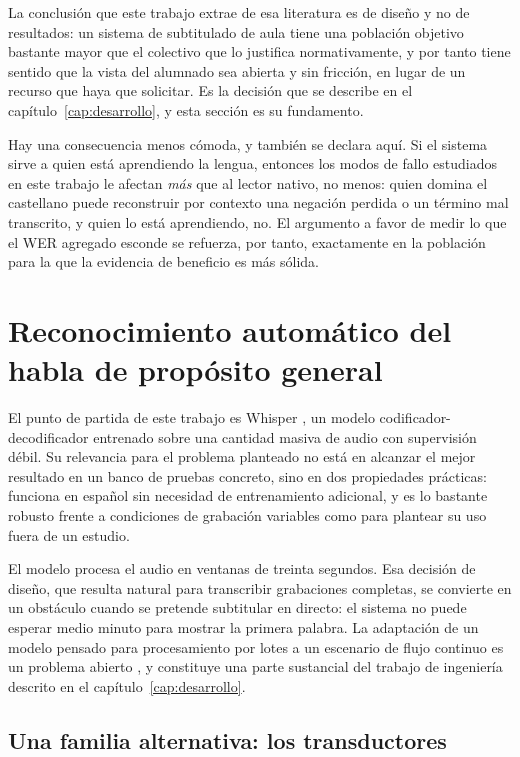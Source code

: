 La conclusión que este trabajo extrae de esa literatura es de diseño y no de resultados: un
sistema de subtitulado de aula tiene una población objetivo bastante mayor que el colectivo
que lo justifica normativamente, y por tanto tiene sentido que la vista del alumnado sea
abierta y sin fricción, en lugar de un recurso que haya que solicitar. Es la decisión que se
describe en el capítulo~\ref{cap:desarrollo}, y esta sección es su fundamento.

Hay una consecuencia menos cómoda, y también se declara aquí. Si el sistema sirve a quien
está aprendiendo la lengua, entonces los modos de fallo estudiados en este trabajo le afectan
\emph{más} que al lector nativo, no menos: quien domina el castellano puede reconstruir por
contexto una negación perdida o un término mal transcrito, y quien lo está aprendiendo,
no. El argumento a favor de medir lo que el WER agregado esconde se refuerza, por tanto,
exactamente en la población para la que la evidencia de beneficio es más sólida.

\section{Reconocimiento automático del habla de propósito general}

El punto de partida de este trabajo es Whisper \cite{radford2023whisper}, un modelo
codificador-decodificador entrenado sobre una cantidad masiva de audio con supervisión
débil. Su relevancia para el problema planteado no está en alcanzar el mejor resultado en
un banco de pruebas concreto, sino en dos propiedades prácticas: funciona en español sin
necesidad de entrenamiento adicional, y es lo bastante robusto frente a condiciones de
grabación variables como para plantear su uso fuera de un estudio.

El modelo procesa el audio en ventanas de treinta segundos. Esa decisión de diseño, que
resulta natural para transcribir grabaciones completas, se convierte en un obstáculo cuando
se pretende subtitular en directo: el sistema no puede esperar medio minuto para mostrar la
primera palabra. La adaptación de un modelo pensado para procesamiento por lotes a un
escenario de flujo continuo es un problema abierto \cite{machacek2023whisperstreaming}, y
constituye una parte sustancial del trabajo de ingeniería descrito en el
capítulo~\ref{cap:desarrollo}.

\subsection{Una familia alternativa: los transductores}
\label{sec:transductores}

